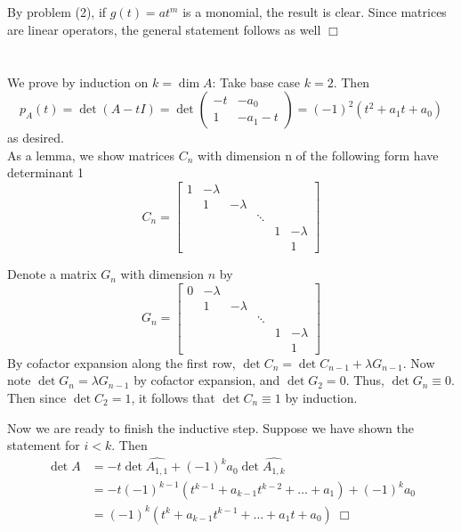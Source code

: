 \documentclass{article}
\newenvironment{myindentpar}[1]
  {\begin{list}{}
          {\setlength{\leftmargin}{#1}}
          \item[]
  }
  {\end{list}}
\begin{document}
\section{}
By problem (2), if $g(t) = at^m$ is a monomial, the result is clear. Since matrices are linear operators, the general statement follows as well $\Box$

\section{}
We prove by induction on $k = \dim A$:
Take base case $k=2$. Then
$$p_A(t) = \det(A-tI) = \det \left( \begin{matrix} -t & -a_0 \\ 1 & -a_1-t \end{matrix} \right) = (-1)^2(t^2 + a_1t+ a_0)$$
as desired.\\
As a lemma, we show matrices $C_n$ with dimension n of the following form have determinant 1
$$C_n = \begin{bmatrix}
    1 & -\lambda & & & & \\
     & 1 & -\lambda & & & \\
     & & & \ddots\\
     & & & &1 & -\lambda\\
     & & & & & 1

\end{bmatrix}$$
\begin{myindentpar}{2em}
    Denote a matrix $G_n$ with dimension $n$ by
    $$G_n = \begin{bmatrix}
        0 & -\lambda & & & & \\
         & 1 & -\lambda & & & \\
         & & & \ddots\\
         & & & &1 & -\lambda\\
         & & & & & 1
    \end{bmatrix}$$
    By cofactor expansion along the first row, $\det C_n = \det C_{n-1} + \lambda G_{n-1}$. Now note $\det G_n = \lambda G_{n-1}$ by cofactor expansion, and $\det G_2 = 0$. Thus, $\det G_n \equiv 0$. Then since $\det C_2 = 1$, it follows that $\det C_n \equiv 1$ by induction.
\end{myindentpar}
Now we are ready to finish the inductive step. Suppose we have shown the statement for $i<k$. Then
\begin{equation*}
    \begin{split}
    \det A &= -t \det \widehat{A_{1,1}} + (-1)^{k}a_0 \det \widehat{A_{1,k}}\\
    &= -t(-1)^{k-1}(t^{k-1} + a_{k-1}t^{k-2} + \dots + a_1) + (-1)^k a_0\\
    &= (-1)^k(t^k + a_{k-1}t^{k-1} + \dots + a_1t + a_0) \; \Box
    \end{split}
\end{equation*}
\end{document}
